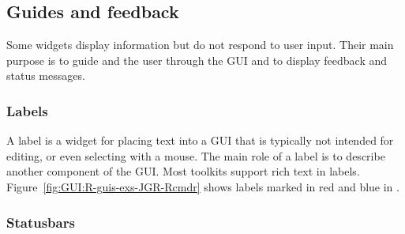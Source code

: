 
\subsection{Guides and feedback}
\label{sec:GUI:info-display}

Some widgets display information but do not respond to user
input. Their main
purpose is to guide and the user through the GUI and to display
feedback and status messages.

\subsubsection{Labels}
\label{sec:GUI:labels}
A label is a widget for placing text into a GUI that is typically not
intended for editing, or even selecting with a mouse. The main role of
a label is to describe another component of the GUI. Most toolkits
support rich text in labels. Figure~\ref{fig:GUI:R-guis-exs-JGR-Rcmdr}
shows labels marked in red and blue in .

\subsubsection{Statusbars}
\label{sec:GUI:statusbars}

